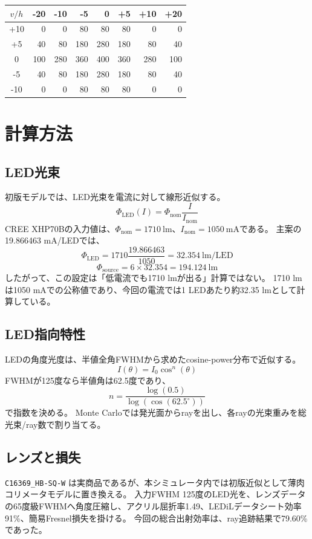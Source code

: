 \documentclass[11pt,a4paper]{article}
\newcommand{\code}[1]{\texttt{#1}}
\begin{document}
\begin{center}
\begin{tabular}{c|rrrrrrr}
\toprule
$v/h$ & -20 & -10 & -5 & 0 & +5 & +10 & +20 \\
\midrule
+10 & 0 & 0 & 80 & 80 & 80 & 0 & 0 \\
+5 & 40 & 80 & 180 & 280 & 180 & 80 & 40 \\
0 & 100 & 280 & 360 & 400 & 360 & 280 & 100 \\
-5 & 40 & 80 & 180 & 280 & 180 & 80 & 40 \\
-10 & 0 & 0 & 80 & 80 & 80 & 0 & 0 \\
\bottomrule
\end{tabular}
\end{center}

\section{計算方法}
\subsection{LED光束}
初版モデルでは、LED光束を電流に対して線形近似する。
\[
\Phi_\mathrm{LED}(I)
= \Phi_\mathrm{nom}\frac{I}{I_\mathrm{nom}}
\]
CREE XHP70Bの入力値は、$\Phi_\mathrm{nom}=1710~\mathrm{lm}$、$I_\mathrm{nom}=1050~\mathrm{mA}$である。
主案の19.866463 mA/LEDでは、
\[
\Phi_\mathrm{LED}
= 1710\frac{19.866463}{1050}
= 32.354~\mathrm{lm/LED}
\]
\[
\Phi_\mathrm{source}
= 6 \times 32.354
= 194.124~\mathrm{lm}
\]
したがって、この設定は「低電流でも1710 lmが出る」計算ではない。
1710 lmは1050 mAでの公称値であり、今回の電流では1 LEDあたり約32.35 lmとして計算している。

\subsection{LED指向特性}
LEDの角度光度は、半値全角FWHMから求めたcosine-power分布で近似する。
\[
I(\theta)=I_0 \cos^n(\theta)
\]
FWHMが125度なら半値角は62.5度であり、
\[
n=\frac{\log(0.5)}{\log(\cos(62.5^\circ))}
\]
で指数を決める。
Monte Carloでは発光面からrayを出し、各rayの光束重みを総光束/ray数で割り当てる。

\subsection{レンズと損失}
\code{C16369\_HB-SQ-W} は実商品であるが、本シミュレータ内では初版近似として薄肉コリメータモデルに置き換える。
入力FWHM 125度のLED光を、レンズデータの65度級FWHMへ角度圧縮し、アクリル屈折率1.49、LEDiLデータシート効率91\%、簡易Fresnel損失を掛ける。
今回の総合出射効率は、ray追跡結果で79.60\%であった。
\end{document}
